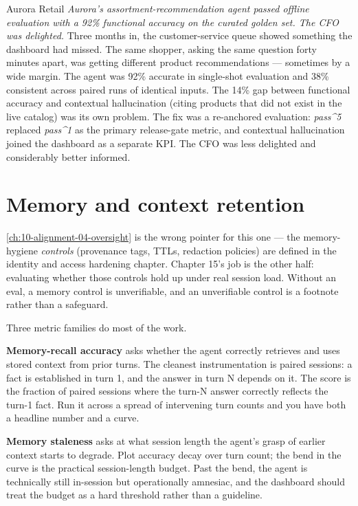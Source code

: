 \begin{TNinpractice}{Aurora Retail}
\textit{Aurora's assortment-recommendation agent passed offline evaluation with a 92\% functional accuracy on the curated golden set. The CFO was delighted.} Three months in, the customer-service queue showed something the dashboard had missed. The same shopper, asking the same question forty minutes apart, was getting different product recommendations --- sometimes by a wide margin. The agent was 92\% accurate in single-shot evaluation and 38\% consistent across paired runs of identical inputs. The 14\% gap between functional accuracy and contextual hallucination (citing products that did not exist in the live catalog) was its own problem. The fix was a re-anchored evaluation: \textit{pass\textasciicircum 5} replaced \textit{pass\textasciicircum 1} as the primary release-gate metric, and contextual hallucination joined the dashboard as a separate KPI. The CFO was less delighted and considerably better informed.
\end{TNinpractice}

\section{Memory and context retention}

\autoref{ch:10-alignment-04-oversight} is the wrong pointer for this one --- the memory-hygiene \textit{controls} (provenance tags, TTLs, redaction policies) are defined in the identity and access hardening chapter. Chapter 15's job is the other half: evaluating whether those controls hold up under real session load. Without an eval, a memory control is unverifiable, and an unverifiable control is a footnote rather than a safeguard.

Three metric families do most of the work.

\textbf{Memory-recall accuracy} asks whether the agent correctly retrieves and uses stored context from prior turns. The cleanest instrumentation is paired sessions: a fact is established in turn 1, and the answer in turn N depends on it. The score is the fraction of paired sessions where the turn-N answer correctly reflects the turn-1 fact. Run it across a spread of intervening turn counts and you have both a headline number and a curve.

\textbf{Memory staleness} asks at what session length the agent's grasp of earlier context starts to degrade. Plot accuracy decay over turn count; the bend in the curve is the practical session-length budget. Past the bend, the agent is technically still in-session but operationally amnesiac, and the dashboard should treat the budget as a hard threshold rather than a guideline.


